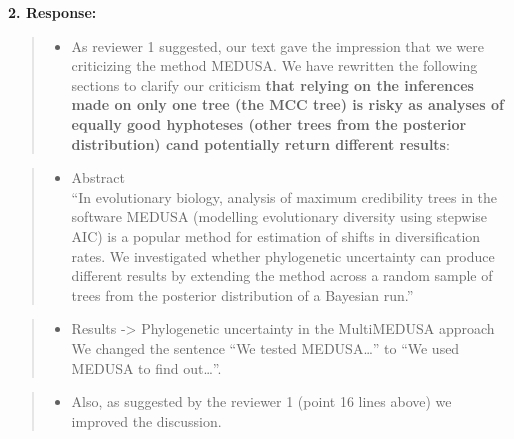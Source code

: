 \documentclass[]{article}
\begin{document}
\textbf{2. Response:}

\begin{quote}
\color{blue}
\begin{itemize}
\itemsep1pt\parskip0pt
\item
  As reviewer 1 suggested, our text gave the impression that we were
  criticizing the method MEDUSA. We have rewritten the following
  sections to clarify our criticism \textbf{that relying on the
  inferences made on only one tree (the MCC tree) is risky as analyses
  of equally good hyphoteses (other trees from the posterior
  distribution) cand potentially return different results}:
\end{itemize}
\end{quote}

\begin{quote}
\color{blue}
\begin{itemize}
\itemsep1pt\parskip0pt
\item
  Abstract\\``In evolutionary biology, analysis of maximum credibility
  trees in the software MEDUSA (modelling evolutionary diversity using
  stepwise AIC) is a popular method for estimation of shifts in
  diversification rates. We investigated whether phylogenetic
  uncertainty can produce different results by extending the method
  across a random sample of trees from the posterior distribution of a
  Bayesian run.''
\end{itemize}
\end{quote}

\begin{quote}
\color{blue}
\begin{itemize}
\itemsep1pt\parskip0pt
\item
  Results -\textgreater{} Phylogenetic uncertainty in the MultiMEDUSA
  approach We changed the sentence ``We tested MEDUSA\ldots{}'' to ``We
  used MEDUSA to find out\ldots{}''.
\end{itemize}
\end{quote}

\begin{quote}
\color{blue}
\begin{itemize}
\itemsep1pt\parskip0pt
\item
  Also, as suggested by the reviewer 1 (point 16 lines above) we
  improved the discussion.
\end{itemize}
\end{quote}
\end{document}
